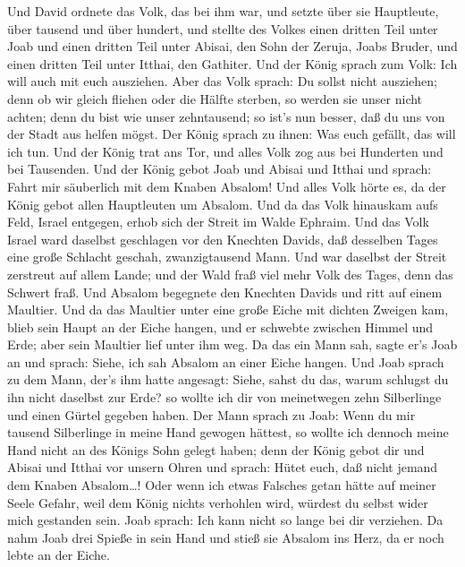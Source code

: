  Und David ordnete das Volk, das bei ihm war, und setzte
über sie Hauptleute, über tausend und über hundert,  und
stellte des Volkes einen dritten Teil unter Joab und einen dritten Teil
unter Abisai, den Sohn der Zeruja, Joabs Bruder, und einen dritten Teil
unter Itthai, den Gathiter. Und der König sprach zum Volk: Ich will auch
mit euch ausziehen.  Aber das Volk sprach: Du sollst nicht
ausziehen; denn ob wir gleich fliehen oder die Hälfte sterben, so werden
sie unser nicht achten; denn du bist wie unser zehntausend; so ist's nun
besser, daß du uns von der Stadt aus helfen mögst.  Der
König sprach zu ihnen: Was euch gefällt, das will ich tun. Und der König
trat ans Tor, und alles Volk zog aus bei Hunderten und bei Tausenden.
 Und der König gebot Joab und Abisai und Itthai und sprach:
Fahrt mir säuberlich mit dem Knaben Absalom! Und alles Volk hörte es, da
der König gebot allen Hauptleuten um Absalom.  Und da das
Volk hinauskam aufs Feld, Israel entgegen, erhob sich der Streit im
Walde Ephraim.  Und das Volk Israel ward daselbst geschlagen
vor den Knechten Davids, daß desselben Tages eine große Schlacht
geschah, zwanzigtausend Mann.  Und war daselbst der Streit
zerstreut auf allem Lande; und der Wald fraß viel mehr Volk des Tages,
denn das Schwert fraß.  Und Absalom begegnete den Knechten
Davids und ritt auf einem Maultier. Und da das Maultier unter eine große
Eiche mit dichten Zweigen kam, blieb sein Haupt an der Eiche hangen, und
er schwebte zwischen Himmel und Erde; aber sein Maultier lief unter ihm
weg.  Da das ein Mann sah, sagte er's Joab an und sprach:
Siehe, ich sah Absalom an einer Eiche hangen.  Und Joab
sprach zu dem Mann, der's ihm hatte angesagt: Siehe, sahst du das, warum
schlugst du ihn nicht daselbst zur Erde? so wollte ich dir von
meinetwegen zehn Silberlinge und einen Gürtel gegeben haben.
 Der Mann sprach zu Joab: Wenn du mir tausend Silberlinge
in meine Hand gewogen hättest, so wollte ich dennoch meine Hand nicht an
des Königs Sohn gelegt haben; denn der König gebot dir und Abisai und
Itthai vor unsern Ohren und sprach: Hütet euch, daß nicht jemand dem
Knaben Absalom\ldots!  Oder wenn ich etwas Falsches getan
hätte auf meiner Seele Gefahr, weil dem König nichts verhohlen wird,
würdest du selbst wider mich gestanden sein.  Joab sprach:
Ich kann nicht so lange bei dir verziehen. Da nahm Joab drei Spieße in
sein Hand und stieß sie Absalom ins Herz, da er noch lebte an der Eiche.
